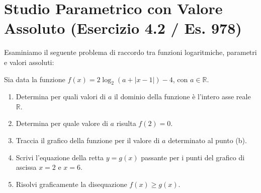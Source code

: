 \documentclass[11pt,a4paper,oneside]{report}
\begin{document}
\section{Studio Parametrico con Valore Assoluto (Esercizio 4.2 / Es. 978)}
Esaminiamo il seguente problema di raccordo tra funzioni logaritmiche, parametri e valori assoluti:

\begin{esercizio}
Sia data la funzione $f(x) = 2\log_2(a + |x - 1|) - 4$, con $a \in \mathbb{R}$.
\begin{enumerate}[label=\alph*.]
    \item Determina per quali valori di $a$ il dominio della funzione è l'intero asse reale $\mathbb{R}$.
    \item Determina per quale valore di $a$ risulta $f(2) = 0$.
    \item Traccia il grafico della funzione per il valore di $a$ determinato al punto (b).
    \item Scrivi l'equazione della retta $y = g(x)$ passante per i punti del grafico di ascissa $x = 2$ e $x = 6$.
    \item Risolvi graficamente la disequazione $f(x) \ge g(x)$.
\end{enumerate}
\end{esercizio}
\end{document}
